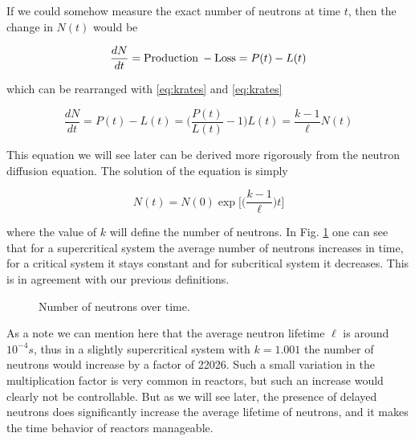 If we could somehow measure the exact number of neutrons at time $t$, then the change in $N(t)$ would be

$$\frac{dN}{dt}={\rm Production \: - Loss}=P(t)-L(t)$$

which can be rearranged with \eqref{eq:krates} and \eqref{eq:krates}

\begin{equation}
\frac{dN}{dt}=P(t)-L(t)=\Big(\frac{P(t)}{L(t)}-1 \Big)L(t)=\frac{k-1}{\ell} N(t)
\end{equation}

\noindent This equation we will see later can be derived more rigorously from the neutron diffusion equation. The solution of the equation is simply

\begin{equation}
N(t)=N(0)\exp\Bigg[\Bigg(\frac{k-1}{\ell}\Bigg)t\Bigg]
\end{equation}

\noindent where the value of $k$ will define the number of neutrons. In Fig. \ref{fig:basickinetics} one can see that for a supercritical system the average number of neutrons increases in time, for a critical system it stays constant and for subcritical system it decreases. This is in agreement with our previous definitions.

\begin{figure}[ht!]
\protect {}\protect
\caption{\label{fig:basickinetics} \footnotesize{Number of neutrons over time.}}
\end{figure}

As a note we can mention here that the average neutron lifetime $\ell$ is around $10^{-4}s$, thus in a slightly supercritical system with $k=1.001$ the number of neutrons would increase by a factor of 22026. Such a small variation in the multiplication factor is very common in reactors, but such an increase would clearly not be controllable. But as we will see later, the presence of delayed neutrons does significantly increase the average lifetime of neutrons, and it makes the time behavior of reactors manageable.

